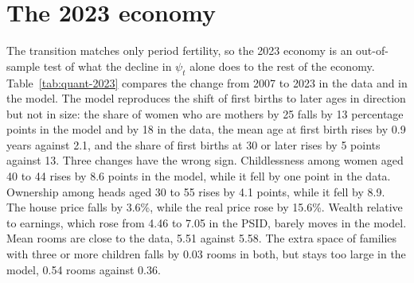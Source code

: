 \section{The 2023 economy}
\label{sec:quant-2023}

The transition matches only period fertility, so the 2023 economy is an
out-of-sample test of what the decline in $\psi_t$ alone does to the rest of
the economy. Table~\ref{tab:quant-2023} compares the change from 2007 to 2023
in the data and in the model. The model reproduces the shift of first births
to later ages in direction but not in size: the share of women who are
mothers by 25 falls by 13 percentage points in the model and by 18 in the
data, the mean age at first birth rises by 0.9 years against 2.1, and the
share of first births at 30 or later rises by 5 points against 13. Three
changes have the wrong sign. Childlessness among women aged 40 to 44 rises by
8.6 points in the model, while it fell by one point in the data. Ownership
among heads aged 30 to 55 rises by 4.1 points, while it fell by 8.9. The
house price falls by 3.6\%, while the real price rose by 15.6\%. Wealth
relative to earnings, which rose from 4.46 to 7.05 in the PSID, barely moves
in the model. Mean rooms are close to the data, 5.51 against 5.58. The extra
space of families with three or more children falls by 0.03 rooms in both,
but stays too large in the model, 0.54 rooms against 0.36.

